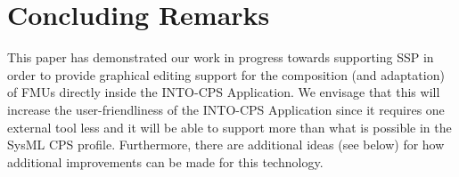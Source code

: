\section{Concluding Remarks}\label{sec:conclude}

This paper has demonstrated our work in progress towards supporting SSP in order to provide graphical editing support for the composition (and adaptation) of FMUs directly inside the INTO-CPS Application. We envisage that this will increase the user-friendliness of the INTO-CPS Application since it requires one external tool less and it will be able to support more than what is possible in the SysML CPS profile.
Furthermore, there are additional ideas (see below) for how additional improvements can be made for this technology.